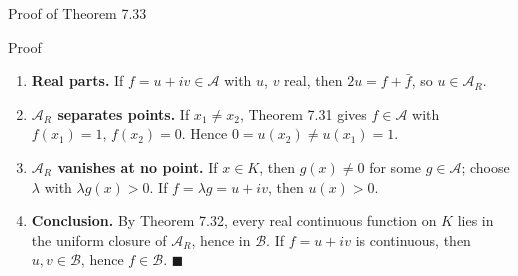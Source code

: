 \documentclass[aspectratio=169,12pt,t]{beamer}
\begin{document}
{\begin{frame}{Proof of Theorem 7.33}
  \vspace{0.1em}
  \begin{proofblock}{Proof}
    \begin{enumerate}\setlength{\itemsep}{0.05em}
      \item \textbf{Real parts.} If $f = u + iv \in \mathscr{A}$ with $u$, $v$ real, then
        $2u = f + \bar{f}$, so $u \in \mathscr{A}_R$.
      \item \textbf{$\mathscr{A}_R$ separates points.} If $x_1 \ne x_2$, Theorem 7.31 gives
        $f \in \mathscr{A}$ with $f(x_1) = 1$, $f(x_2) = 0$. Hence $0 = u(x_2) \ne u(x_1) = 1$.
      \item \textbf{$\mathscr{A}_R$ vanishes at no point.} If $x \in K$, then $g(x) \ne 0$ for some
        $g \in \mathscr{A}$; choose $\lambda$ with $\lambda g(x) > 0$. If
        $f = \lambda g = u + iv$, then $u(x) > 0$.
      \item \textbf{Conclusion.} By Theorem 7.32, every real continuous function on $K$ lies in
        the uniform closure of $\mathscr{A}_R$, hence in $\mathscr{B}$. If $f = u + iv$ is
        continuous, then $u, v \in \mathscr{B}$, hence $f \in \mathscr{B}$.
        \hfill $\blacksquare$
    \end{enumerate}
  \end{proofblock}

\end{frame}
}
\end{document}
